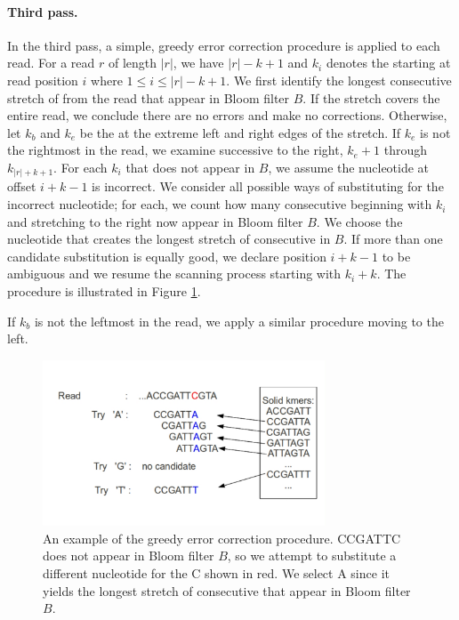 \documentclass[10pt]{article}
\begin{document}

\paragraph{Third pass.} 
In the third pass, a simple, greedy error correction procedure is applied to each read.
For a read $r$ of length $|r|$, we have $|r|-k+1$ \kmers and $k_i$ denotes the \kmer starting at read position $i$ where $1\le i\le|r|-k+1$.
We first identify the longest consecutive stretch of \kmers from the read that appear in Bloom filter $B$.
If the stretch covers the entire read, we conclude there are no errors and make no corrections.
Otherwise, let $k_b$ and $k_e$ be the \kmers at the extreme left and right edges of the stretch.
If $k_e$ is not the rightmost \kmer in the read, we examine successive \kmers to the right, $k_e+1$ through $k_{|r|+k+1}$.
For each \kmer $k_i$ that does not appear in $B$, we assume the nucleotide at offset $i+k-1$ is incorrect.
We consider all possible ways of substituting for the incorrect nucleotide; for each, we count how many consecutive \kmers beginning with $k_i$ and stretching to the right now appear in Bloom filter $B$.
We choose the nucleotide that creates the longest stretch of consecutive \kmers in $B$.
If more than one candidate substitution is equally good, we declare position $i+k-1$ to be ambiguous and we resume the scanning process starting with \kmer $k_i+k$.  The procedure is illustrated in Figure \ref{fig:error_correction}.

If $k_b$ is not the leftmost \kmer in the read, we apply a similar procedure moving to the left.

\begin{figure}[h!]
\begin{center}
\includegraphics[width=0.75\textwidth]{ErrorCorrection.jpg}
\caption{An example of the greedy error correction procedure.  \kmer CCGATTC does not appear in Bloom filter $B$, so we attempt to substitute a different nucleotide for the C shown in red.  We select A since it yields the longest stretch of consecutive \kmers that appear in Bloom filter $B$.  \label{fig:error_correction}}
\end{center}
\end{figure}
\end{document}

